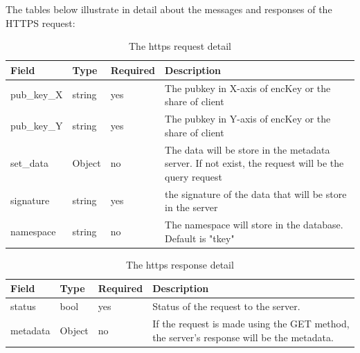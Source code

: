 \documentclass[../Main.tex]{subfiles}
\begin{document}
The tables below illustrate in detail about the messages and responses of the HTTPS request:\\

\begin{table}[H]
  \centering
  \begin{tabular}{|l|l|l|p{8cm}|}
\hline
\rowcolor[HTML]{F56B00} 
\textbf{Field} & \textbf{Type} & \textbf{Required} & \textbf{Description}                                        \\ \hline
pub\_key\_X    & string        & yes               & The pubkey in X-axis of encKey or the share of client       \\ \hline
pub\_key\_Y    & string        & yes               & The pubkey in Y-axis of encKey or the share of client       \\ \hline
set\_data      & Object        & no               & The data will be store in the metadata server. If not exist, the request will be the query request               \\ \hline
signature      & string        & yes               & the signature of the data that will be store in the server  \\ \hline
namespace      & string        & no                & The namespace will store in the database. Default is "tkey" \\ \hline
\end{tabular}
  \caption{The https request detail}
  \label{https-request-detail}
\end{table}

\begin{table}[H]
  \centering
  \begin{tabular}{|l|l|l|p{8cm}|}
\hline
\rowcolor[HTML]{F56B00} 
\textbf{Field} & \textbf{Type} & \textbf{Required} & \textbf{Description}                                                                     \\ \hline
status         & bool          & yes               & Status of the request to the server.                                                     \\ \hline
metadata       & Object        & no                & If the request is made using the GET method, the server's response will be the metadata. \\ \hline
\end{tabular}
  \caption{The https response detail}
  \label{https-response-detail}
\end{table}
\end{document}
